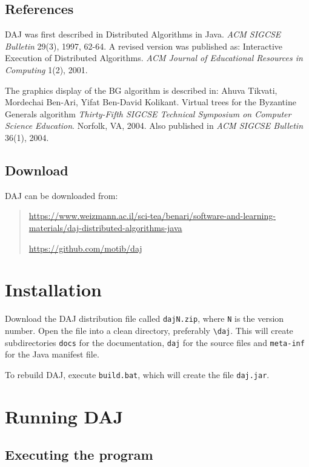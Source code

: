 \documentclass[11pt]{article}
\newcommand{\daj}{\textsc{DAJ}}
\newcommand{\p}[1]{\texttt{#1}}
\begin{document}
\subsection{References} \daj{} was first described in Distributed
Algorithms in Java. \emph{ACM SIGCSE Bulletin} 29(3), 1997, 62-64.
A revised version was published as: Interactive Execution of
Distributed Algorithms. \emph{ACM Journal of Educational
Resources in Computing} 1(2), 2001.

The graphics display of the BG algorithm is described in:
Ahuva Tikvati, Mordechai Ben-Ari, Yifat Ben-David Kolikant.
Virtual trees for the Byzantine Generals algorithm
\textit{Thirty-Fifth SIGCSE Technical Symposium on Computer Science Education}.
Norfolk, VA, 2004. Also published in \textit{ACM SIGCSE Bulletin} 36(1), 2004.

\subsection{Download}

\daj{} can be downloaded from:
\begin{quote}
\url{https://www.weizmann.ac.il/sci-tea/benari/software-and-learning-materials/daj-distributed-algorithms-java}

\url{https://github.com/motib/daj}
\end{quote}

\section{Installation}

Download the \daj{} distribution file called \p{dajN.zip},
where \p{N} is the version number.
Open the file into a clean directory, preferably \verb=\=\p{daj}.
This will create subdirectories \p{docs} for the documentation,
\p{daj} for the source files and
\p{meta-inf} for the Java manifest file.

To rebuild \daj{}, execute \p{build.bat}, which will create the
file \p{daj.jar}.

\section{Running \daj{}}\label{s.run}

\subsection{Executing the program}
\end{document}
